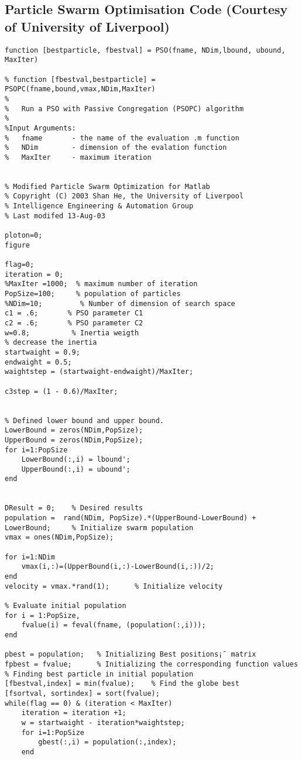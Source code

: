 \documentclass{article}
\begin{document}
\subsection*{Particle Swarm Optimisation Code (Courtesy of University of Liverpool)}
\begin{lstlisting}[style=Matlab-editor]
function [bestparticle, fbestval] = PSO(fname, NDim,lbound, ubound, MaxIter)

% function [fbestval,bestparticle] = PSOPC(fname,bound,vmax,NDim,MaxIter)
%                          
%   Run a PSO with Passive Congregation (PSOPC) algorithm
%   
%Input Arguments:
%   fname       - the name of the evaluation .m function
%   NDim        - dimension of the evalation function
%   MaxIter     - maximum iteration


% Modified Particle Swarm Optimization for Matlab  
% Copyright (C) 2003 Shan He, the University of Liverpool
% Intelligence Engineering & Automation Group
% Last modifed 13-Aug-03

ploton=0;
figure

flag=0;
iteration = 0;
%MaxIter =1000;  % maximum number of iteration
PopSize=100;     % population of particles
%NDim=10;         % Number of dimension of search space
c1 = .6;       % PSO parameter C1
c2 = .6;       % PSO parameter C2
w=0.8;          % Inertia weigth
% decrease the inertia 
startwaight = 0.9;
endwaight = 0.5;
waightstep = (startwaight-endwaight)/MaxIter;

c3step = (1 - 0.6)/MaxIter;


% Defined lower bound and upper bound.
LowerBound = zeros(NDim,PopSize);
UpperBound = zeros(NDim,PopSize);
for i=1:PopSize
    LowerBound(:,i) = lbound';
    UpperBound(:,i) = ubound';
end


DResult = 0;    % Desired results
population =  rand(NDim, PopSize).*(UpperBound-LowerBound) + LowerBound;     % Initialize swarm population
vmax = ones(NDim,PopSize);

for i=1:NDim
    vmax(i,:)=(UpperBound(i,:)-LowerBound(i,:))/2;
end
velocity = vmax.*rand(1);      % Initialize velocity

% Evaluate initial population
for i = 1:PopSize,
    fvalue(i) = feval(fname, (population(:,i)));
end

pbest = population;   % Initializing Best positions¡¯ matrix
fpbest = fvalue;      % Initializing the corresponding function values
% Finding best particle in initial population
[fbestval,index] = min(fvalue);    % Find the globe best   
[fsortval, sortindex] = sort(fvalue);
while(flag == 0) & (iteration < MaxIter)
    iteration = iteration +1;
    w = startwaight - iteration*waightstep;
    for i=1:PopSize
        gbest(:,i) = population(:,index);
    end
    

\end{lstlisting}
\end{document}
